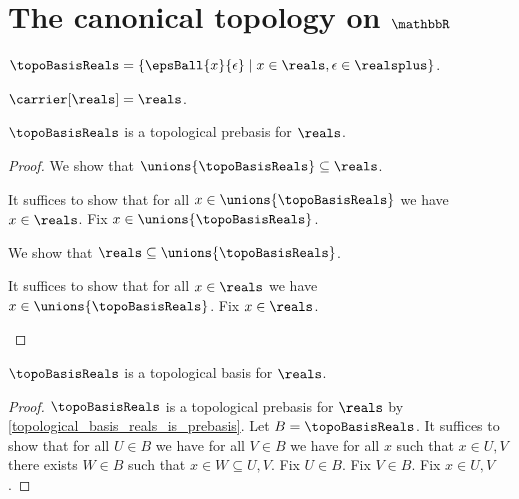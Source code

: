 












\section{The canonical topology on $\mathbbR$}

\begin{definition}\label{topological_basis_reals_eps_ball}
    $\topoBasisReals = \{ \epsBall{x}{\epsilon} \mid x \in \reals, \epsilon \in \realsplus\}$.
\end{definition}

\begin{axiom}\label{reals_carrier_reals}
    $\carrier[\reals] = \reals$.
\end{axiom}

\begin{theorem}\label{topological_basis_reals_is_prebasis}
    $\topoBasisReals$ is a topological prebasis for $\reals$.
\end{theorem}
\begin{proof}
    We show that $\unions{\topoBasisReals} \subseteq \reals$.
    \begin{subproof}
        It suffices to show that for all $x \in \unions{\topoBasisReals}$ we have $x \in \reals$.
        Fix $x \in \unions{\topoBasisReals}$.
    \end{subproof}
    We show that $\reals \subseteq \unions{\topoBasisReals}$.
    \begin{subproof}
        It suffices to show that for all $x \in \reals$ we have $x \in \unions{\topoBasisReals}$.
        Fix $x \in \reals$.
    \end{subproof}
\end{proof}

\begin{theorem}\label{topological_basis_reals_is_basis}
    $\topoBasisReals$ is a topological basis for $\reals$.
\end{theorem}
\begin{proof}
    $\topoBasisReals$ is a topological prebasis for $\reals$ by \cref{topological_basis_reals_is_prebasis}.
    Let $B = \topoBasisReals$.
    It suffices to show that for all $U \in B$ we have for all $V \in B$ we have for all $x$ such that $x \in U, V$ there exists $W\in B$ such that $x\in W\subseteq U, V$.
    Fix $U \in B$.
    Fix $V \in B$.
    Fix $x \in U, V$.
\end{proof}

